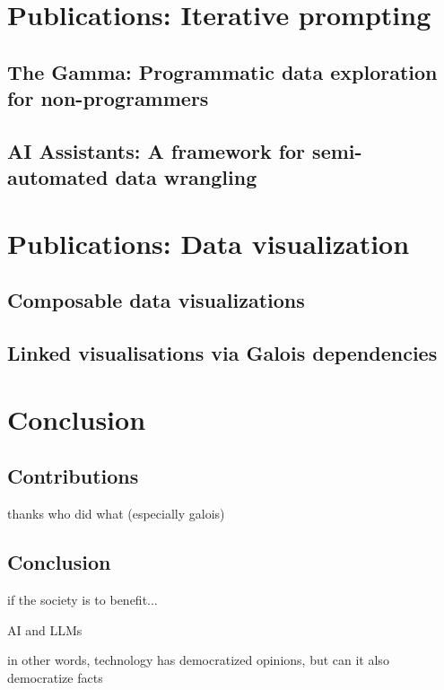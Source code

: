 \documentclass[fleqn,11pt]{report}
\theoremstyle{definition}
\begin{document}
\part{Publications: Iterative prompting}
\label{part:iterative}

\chapter{The Gamma: Programmatic data exploration for non-programmers}
\label{ch:thegamma}

\chapter{AI Assistants: A framework for semi-automated data wrangling}
\label{ch:aia}

\part{Publications: Data visualization}
\label{part:visualization}

\chapter{Composable data visualizations}
\label{ch:compost}

\chapter{Linked visualisations via Galois dependencies}
\label{ch:galois}

\part{Conclusion}

\chapter{Contributions}

thanks
who did what
(especially galois)

\chapter{Conclusion}




if the society is to benefit...

AI and LLMs

in other words, technology has democratized opinions, but can it also democratize facts


























%

\end{document}

